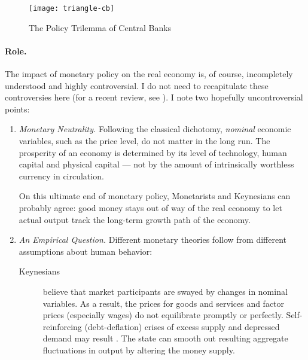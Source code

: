 \begin{figure}[htbp]
	\centering
	\texttt{[image: triangle-cb]}
	\caption{The Policy Trilemma of Central Banks}
	\label{fig:triangle-cb}
\end{figure}

\paragraph[Role]{Role.}
The impact of monetary policy on the real economy is, of course, incompletely understood and highly controversial.
I do not need to recapitulate these controversies here (for a recent review, see \citealt{Wapshott2011}).
I note two hopefully uncontroversial points:

\begin{enumerate}
	\item \emph{Monetary Neutrality.}
		\label{itm:monetary-neutrality}
	Following the classical dichotomy, \emph{nominal} economic variables, such as the price level, do not matter in the long run.
	The prosperity of an economy is determined by its level of technology, human capital and physical capital --- not by the amount of intrinsically worthless currency in circulation.

	On this ultimate end of monetary policy, Monetarists and Keynesians can probably agree:
	good money stays out of way of the real economy to let actual output track the long-term growth path of the economy.

	\item \emph{An Empirical Question.}
		\label{itm:empirical-macroeconomics}
	Different monetary theories follow from different assumptions about human behavior:


	\begin{description}
		\item[Keynesians]
		believe that market participants are swayed by changes in nominal variables.
		As a result, the prices for goods and services and factor prices (especially wages) do not equilibrate promptly or perfectly.
		Self-reinforcing (debt-deflation) crises of excess supply and depressed demand may result \citep{Fisher1933}.
		The state can smooth out resulting aggregate fluctuations in output by altering the money supply.


\end{description}
\end{enumerate}
